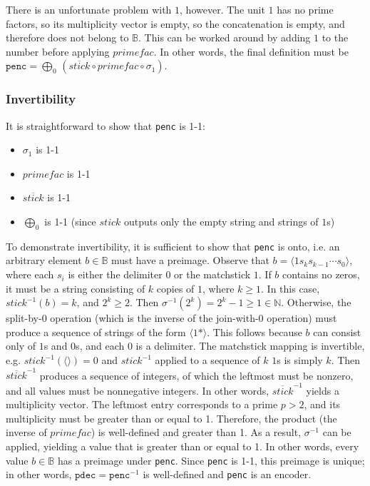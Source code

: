 \documentclass[12pt,reqno]{article}
\begin{document}
There is an unfortunate problem with $1$, however. The unit $1$ has no prime factors, so its multiplicity vector is empty, so the concatenation is empty, and therefore does not belong to $\mathbb{B}$. This can be worked around by adding $1$ to the number before applying $primefac$. In other words, the final definition must be $\texttt{penc} = \bigoplus_0 \, (\overline{stick} \circ primefac \circ \sigma_1)$.

\subsubsection{Invertibility}

It is straightforward to show that \texttt{penc} is 1-1: \begin{itemize}
  \item $\sigma_1$ is 1-1
  \item $primefac$ is 1-1
  \item $\overline{stick}$ is 1-1
  \item $\bigoplus_0$ is 1-1 (since $stick$ outputs only the empty string and strings of $1$s)
\end{itemize}


To demonstrate invertibility, it is sufficient to show that \texttt{penc} is onto, i.e. an arbitrary element $b \in \mathbb{B}$ must have a preimage. Observe that $b = \langle 1 s_{k} s_{k-1} \cdots s_0 \rangle$, where each $s_i$ is either the delimiter $0$ or the matchstick $1$. If $b$ contains no zeros, it must be a string consisting of $k$ copies of $1$, where $k \geq 1$. In this case, $stick^{-1}(b) = k$, and $2^k \geq 2$. Then $\sigma^{-1}(2^k) = 2^k - 1 \geq 1\in \mathbb{N}$. Otherwise, the split-by-$0$ operation (which is the inverse of the join-with-$0$ operation) must produce a sequence of strings of the form $\langle 1* \rangle$. This follows because $b$ can consist only of $1$s and $0$s, and each $0$ is a delimiter. The matchstick mapping is invertible, e.g. $stick^{-1}(\langle \rangle) = 0$ and $stick^{-1}$ applied to a sequence of $k$ $1$s is simply $k$. Then $\overline{stick}^{-1}$ produces a sequence of integers, of which the leftmost must be nonzero, and all values must be nonnegative integers. In other words, $\overline{stick}^{-1}$ yields a multiplicity vector. The leftmost entry corresponds to a prime $p > 2$, and its multiplicity must be greater than or equal to 1. Therefore, the product (the inverse of $primefac$) is well-defined and greater than 1. As a result, $\sigma^{-1}$ can be applied, yielding a value that is greater than or equal to 1. In other words, every value $b \in \mathbb{B}$ has a preimage under \texttt{penc}. Since \texttt{penc} is 1-1, this preimage is unique; in other words, $\texttt{pdec} = \texttt{penc}^{-1}$ is well-defined and \texttt{penc} is an encoder.
\end{document}

